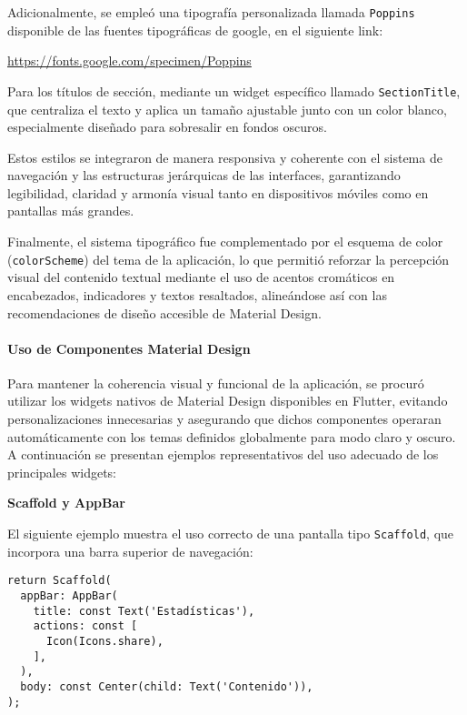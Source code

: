 Adicionalmente, se empleó una tipografía personalizada llamada \texttt{Poppins} disponible de las fuentes tipográficas de google, en el siguiente link: 
\begin{center}
  \url{https://fonts.google.com/specimen/Poppins}
\end{center}

Para los títulos de sección, mediante un widget específico llamado \texttt{SectionTitle}, que centraliza el texto y aplica un tamaño ajustable junto con un color blanco, especialmente diseñado para sobresalir en fondos oscuros.

Estos estilos se integraron de manera responsiva y coherente con el sistema de navegación y las estructuras jerárquicas de las interfaces, garantizando legibilidad, claridad y armonía visual tanto en dispositivos móviles como en pantallas más grandes.

Finalmente, el sistema tipográfico fue complementado por el esquema de color (\texttt{colorScheme}) del tema de la aplicación, lo que permitió reforzar la percepción visual del contenido textual mediante el uso de acentos cromáticos en encabezados, indicadores y textos resaltados, alineándose así con las recomendaciones de diseño accesible de Material Design.


\newpage
\paragraph{Uso de Componentes Material Design}

Para mantener la coherencia visual y funcional de la aplicación, se procuró utilizar los widgets nativos de Material Design disponibles en Flutter, evitando personalizaciones innecesarias y asegurando que dichos componentes operaran automáticamente con los temas definidos globalmente para modo claro y oscuro. A continuación se presentan ejemplos representativos del uso adecuado de los principales widgets:

\textbf{Scaffold y AppBar}

El siguiente ejemplo muestra el uso correcto de una pantalla tipo \texttt{Scaffold}, que incorpora una barra superior de navegación:

\begin{verbatim}
return Scaffold(
  appBar: AppBar(
    title: const Text('Estadísticas'),
    actions: const [
      Icon(Icons.share),
    ],
  ),
  body: const Center(child: Text('Contenido')),
);
\end{verbatim}

